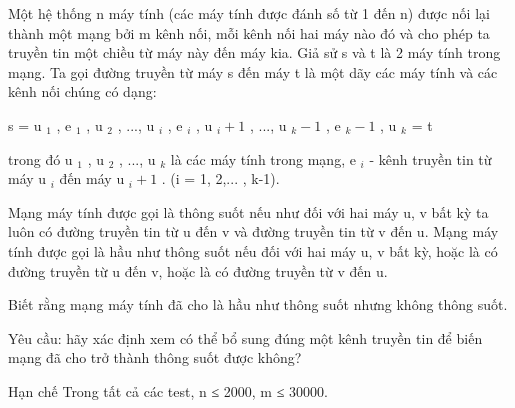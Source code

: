 Một hệ thống n máy tính (các máy tính được đánh số từ 1 đến n) được nối lại thành một mạng bởi m kênh nối, mỗi kênh nối hai máy nào đó và cho phép ta truyền tin một chiều từ máy này đến máy kia. Giả sử s và t là 2 máy tính trong mạng. Ta gọi đường truyền từ máy s đến máy t là một dãy các máy tính và các kênh nối chúng có dạng:  

   s = u   $_    1   $   , e   $_    1   $   , u   $_    2   $   , ..., u   $_    i   $   , e   $_    i   $   , u   $_    i+1   $   , ..., u   $_    k-1   $   , e   $_    k-1   $   , u   $_    k   $   = t  

   trong đó u   $_    1   $   , u   $_    2   $   , ..., u   $_    k   $   là các máy tính trong mạng, e   $_    i   $   - kênh truyền tin từ máy u   $_    i   $   đến máy u   $_    i+1   $   . (i = 1, 2,... , k-1).  

   Mạng máy tính được gọi là thông suốt nếu như đối với hai máy u, v bất kỳ ta luôn có đường truyền tin từ u đến v và đường truyền tin từ v đến u. Mạng máy tính được gọi là hầu như thông suốt nếu đối với hai máy u, v bất kỳ, hoặc là có đường truyền từ u đến v, hoặc là có đường truyền từ v đến u.  

   Biết rằng mạng máy tính đã cho là hầu như thông suốt nhưng không thông suốt.  

   Yêu cầu: hãy xác định xem có thể bổ sung đúng một kênh truyền tin để biến mạng đã cho trở thành thông suốt được không?  

Hạn chế
Trong tất cả các test, n ≤ 2000, m ≤ 30000.
